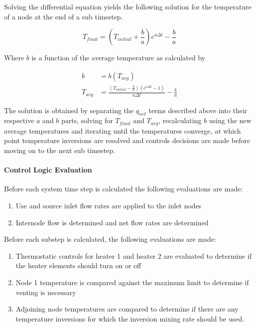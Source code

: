 Solving the differential equation yields the following solution for the temperature of a node at the end of a sub timestep. 

\begin{equation}
  T_{final} = \left( T_{initial} + \frac{b}{a} \right) e ^ {a \Delta t} - \frac{b}{a}
\end{equation}

Where $b$ is a function of the average temperature as calculated by

\begin{equation}
  \begin{array}{rl}
    b &= b(T_{avg}) \\
    T_{avg} &= \frac{(T_{initial} - \frac{b}{a}) (e ^ {a \Delta t} - 1)}{a \Delta t} - \frac{b}{a}
  \end{array}
\end{equation}

The solution is obtained by separating the $q_{net}$ terms described above into their respective $a$ and $b$ parts, solving for $T_{final}$ and $T_{avg}$, recalculating $b$ using the new average temperatures and iterating until the temperatures converge, at which point temperature inversions are resolved and controls decisions are made before moving on to the next sub timestep.

\paragraph{Control Logic Evaluation}

Before each system time step is calculated the following evaluations are made:

\begin{enumerate}
\item Use and source inlet flow rates are applied to the inlet nodes
\item Internode flow is determined and net flow rates are determined
\end{enumerate}

Before each substep is calculated, the following evaluations are made:

\begin{enumerate}
\item Thermostatic controls for heater 1 and heater 2 are evaluated to determine if the heater elements should turn on or off
\item Node 1 temperature is compared against the maximum limit to determine if venting is necessary
\item Adjoining node temperatures are compared to determine if there are any temperature inversions for which the inversion mixing rate should be used.
\end{enumerate}

